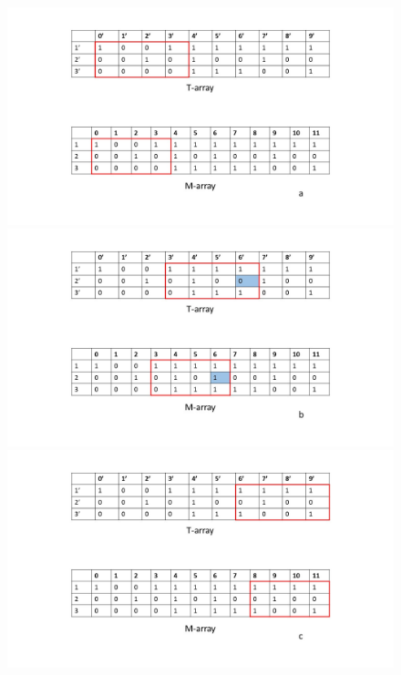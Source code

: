 \begin{figure}[h]
	\centering
	\hspace*{-2cm}
   \begin{minipage}[b]{0.50\linewidth}
      \centering \includegraphics[scale=0.3]{fig/detect1.jpg}
   \end{minipage}\hfill
   \begin{minipage}[b]{0.50\linewidth}   
      \centering \includegraphics[scale=0.3]{fig/detect2.jpg}
   \end{minipage}
	\hspace*{-2cm}
   \begin{minipage}[b]{0.50\linewidth}
      \centering \includegraphics[scale=0.3]{fig/detect3.jpg}

\end{minipage}
\end{figure}
